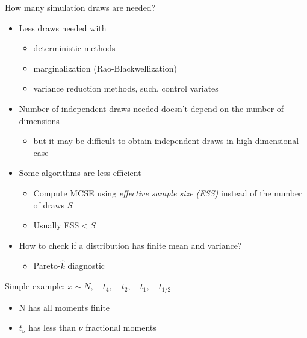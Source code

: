 \documentclass[english,t]{beamer}
\begin{document}
\begin{frame}{How many simulation draws are needed?}

  \begin{itemize}
  \item Less draws needed with
    \begin{itemize}
    \item deterministic methods
    \item marginalization (Rao-Blackwellization)
    \item variance reduction methods, such, control variates
    \end{itemize}
  \item<2-> Number of independent draws needed doesn't depend on the
    number of dimensions
    \begin{itemize}
    \item but it may be difficult to obtain independent draws in high
      dimensional case
    \end{itemize}
  \item<3-> Some algorithms are less efficient
    \begin{itemize}
    \item Compute MCSE using \textit{effective sample size (ESS)}
      instead of the number of draws $S$
    \item Usually ESS$<S$
    \end{itemize}
  \item<4-> How to check if a distribution has finite mean and variance?
    \begin{itemize}
    \item Pareto-$\hat{k}$ diagnostic
    \end{itemize}
  \end{itemize}

\end{frame}

\begin{frame}{Simple example: $x \sim N, \quad t_4, \quad t_2, \quad t_1, \quad t_{1/2}$}

  \begin{itemize}
  \item N has all moments finite
  \item $t_\nu$ has less than $\nu$ fractional moments
  \end{itemize}
\end{frame}
\end{document}
